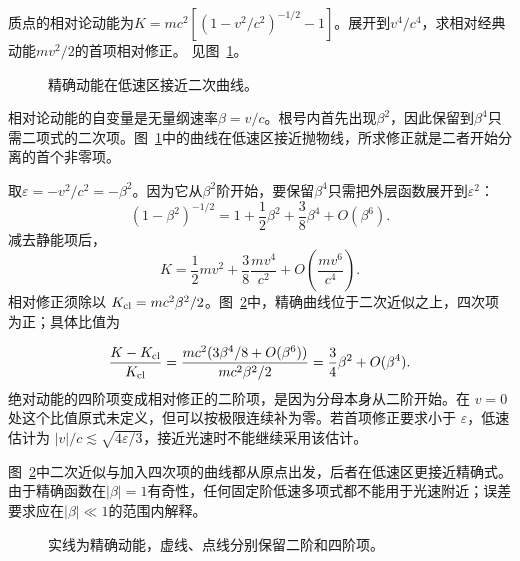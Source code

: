 \begin{exercise}[相对论动能的低速展开]\label{ex:c1-h6}
质点的相对论动能为$K=mc^2[(1-v^2/c^2)^{-1/2}-1]$。展开到$v^4/c^4$，求相对经典动能$mv^2/2$的首项相对修正。 见图~\ref{fig:c1-h6-q}。
\end{exercise}

\begin{figure}[H]\centering
{}
\caption{精确动能在低速区接近二次曲线。}\label{fig:c1-h6-q}
\end{figure}
\begin{solution}
相对论动能的自变量是无量纲速率$\beta=v/c$。根号内首先出现$\beta^2$，因此保留到$\beta^4$只需二项式的二次项。图~\ref{fig:c1-h6-q}中的曲线在低速区接近抛物线，所求修正就是二者开始分离的首个非零项。


取$\varepsilon=-v^2/c^2=-\beta^2$。因为它从$\beta^2$阶开始，要保留$\beta^4$只需把外层函数展开到$\varepsilon^2$：
\[(1-\beta^2)^{-1/2}=1+\frac12\beta^2+\frac38\beta^4+O(\beta^6).
\]
减去静能项后，
\[\boxed{K=\frac12mv^2+\frac38\frac{mv^4}{c^2}+O\!\left(\frac{mv^6}{c^4}\right)}.
\]
相对修正须除以 $K_{\rm cl}=mc^2\beta^2/2$。图~\ref{fig:c1-h6-s}中，精确曲线位于二次近似之上，四次项为正；具体比值为


\[\frac{K-K_{\rm cl}}{K_{\rm cl}}
=\frac{mc^2(3\beta^4/8+O(\beta^6))}{mc^2\beta^2/2}
=\frac34\beta^2+O(\beta^4).\]
绝对动能的四阶项变成相对修正的二阶项，是因为分母本身从二阶开始。在 $v=0$ 处这个比值原式未定义，但可以按极限连续补为零。若首项修正要求小于 $\varepsilon$，低速估计为 $|v|/c\lesssim\sqrt{4\varepsilon/3}$，接近光速时不能继续采用该估计。

图~\ref{fig:c1-h6-s}中二次近似与加入四次项的曲线都从原点出发，后者在低速区更接近精确式。由于精确函数在$|\beta|=1$有奇性，任何固定阶低速多项式都不能用于光速附近；误差要求应在$|\beta|\ll1$的范围内解释。

\begin{figure}[H]\centering
{}
\caption{实线为精确动能，虚线、点线分别保留二阶和四阶项。}\label{fig:c1-h6-s}
\end{figure}
\end{solution}


